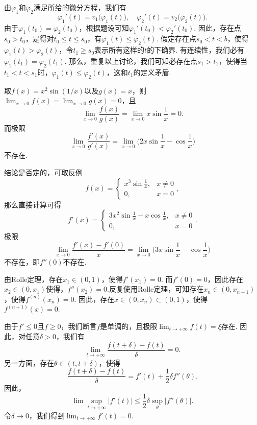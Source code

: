 \begin{ans}
  由$\varphi_1$和$\varphi_2$满足所给的微分方程，我们有
  \[
    \varphi_1'(t)=v_1\big(\varphi_1(t)\big),\quad
    \varphi_2'(t)=v_2\big(\varphi_2(t)\big).
  \]
  由于$\varphi_1(t_0)=\varphi_2(t_0)$，根据题设可知$\varphi_1'(t_0)<\varphi_2'(t_0)$. 因此，存在点$s_0>t_0$，是得对$t_0\le t\le s_0$，有$\varphi_1(t)\le\varphi_2(t)$. 假定存在点$s_0<t<b$，使得$\varphi_1(t)>\varphi_2(t)$，令$t_1\ge s_0$表示所有这样的$t$的下确界. 有连续性，我们必有$\varphi_1(t_1)=\varphi_2(t_1)$. 那么，重复以上讨论，我们可知必存在点$s_1>t_1$，使得当$t_1<t<s_1$时，$\varphi_1(t)\le\varphi_2(t)$，这和$t_1$的定义矛盾.
\end{ans}

\begin{ans}
  取$f(x)=x^2\sin(1/x)$以及$g(x)=x$，则$\lim_{x\to0}f(x)=\lim_{x\to0}g(x)=0$，且
  \[
    \lim_{x\to0}\frac{f(x)}{g(x)}=\lim_{x\to0}x\sin\frac1x=0.
  \]
  而极限
  \[
    \lim_{x\to0}\frac{f'(x)}{g'(x)}=\lim_{x\to0}
    \Big( 2x\sin\frac1x-\cos\frac1x \Big)
  \]
  不存在.
\end{ans}

\begin{ans}
  结论是否定的，可取反例
  \[
    f(x)=\begin{cases}
      x^3\sin\frac1x, & x\ne 0\\
      0, & x=0
    \end{cases},
  \]
  那么直接计算可得
  \[
    f'(x)=\begin{cases}
      3x^2\sin\frac1x-x\cos\frac1x, & x\ne0\\
      0, & x=0
    \end{cases}.
  \]
  极限
  \[
    \lim_{x\to0}\frac{f'(x)-f'(0)}x =
    \lim_{x\to0}\Big(3x\sin\frac1x-\cos\frac1x\Big)
  \]
  不存在，即$f''(0)$不存在.
\end{ans}

\begin{ans}
  由Rolle定理，存在$x_1\in(0,1)$，使得$f'(x_1)=0$. 而$f'(0)=0$，因此存在$x_2\in(0,x_1)$使得，$f''(x_2)=0$.反复使用Rolle定理，可知存在$x_n\in(0,x_{n-1})$，使得$f^{(n)}(x_n)=0$. 因此，存在$x\in(0,x_n)\subset(0,1)$，使得$f^{(n+1)}(x)=0$.
\end{ans}

\begin{ans}
  由于$f'\le0$且$f\ge0$，我们断言$f$是单调的，且极限$\lim_{t\to+\infty}f(t)=\xi$存在. 因此，对任意$\delta>0$，我们有
  \[
    \lim_{t\to+\infty}\frac{f(t+\delta)-f(t)}\delta=0.
  \]
  另一方面，存在$\theta\in(t,t+\delta)$，使得
  \[
    \frac{f(t+\delta)-f(t)}\delta
    =f'(t)+\frac12\delta f''(\theta).
  \]
  因此，
  \[
    \lim\sup_{t\to+\infty}|f'(t)|\le\frac12\delta\sup_{\theta}
    |f''(\theta)|.
  \]
  令$\delta\to0$，我们得到$\lim_{t\to+\infty}f'(t)=0$.
\end{ans}

